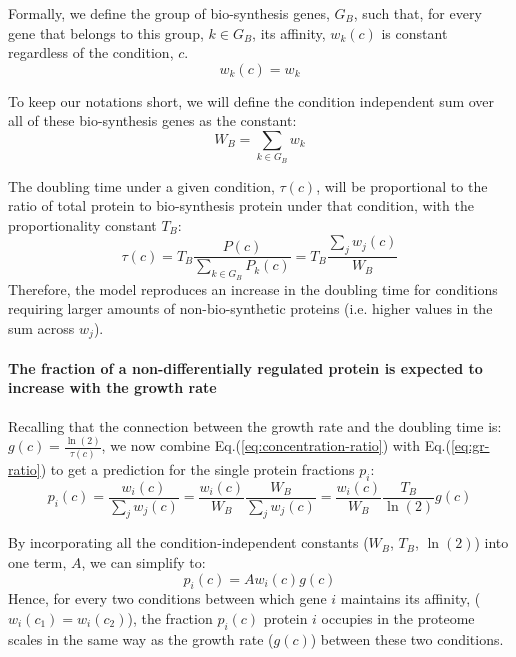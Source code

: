 \documentclass[10pt,letterpaper]{article}
\begin{document}
Formally, we define the group of bio-synthesis genes, $G_B$, such that, for every gene that belongs to this group, $k \in G_B$, its affinity, $w_k(c)$ is constant regardless of the condition, $c$.
\begin{equation}
  \label{eq:biosynth-def}
  w_k(c)=w_k
\end{equation}

To keep our notations short, we will define the condition independent sum over all of these bio-synthesis genes as the constant:
\[
W_B = \sum_{k\in G_B}w_k
\]

The doubling time under a given condition, $\tau(c)$, will be proportional to the ratio of total protein to bio-synthesis protein under that condition, with the proportionality constant $T_B$:
\begin{equation}
  \label{eq:gr-ratio}
  \tau(c) = T_B\frac{P(c)}{\sum_{k\in G_B}P_k(c)}=T_B\frac{\sum_jw_j(c)}{W_B}
\end{equation}
Therefore, the model reproduces an increase in the doubling time for conditions requiring larger amounts of non-bio-synthetic proteins (i.e. higher values in the sum across $w_j$).

\paragraph{The fraction of a non-differentially regulated protein is expected to increase with the growth rate}

Recalling that the connection between the growth rate and the doubling time is: $g(c)=\frac{\ln(2)}{\tau(c)}$, we now combine Eq.(\ref{eq:concentration-ratio}) with Eq.(\ref{eq:gr-ratio}) to get a prediction for the single protein fractions $p_i$:
\begin{equation}
  \label{eq:default-response}
  p_i(c)=\frac{w_i(c)}{\sum_jw_j(c)}=\frac{w_i(c)}{W_B}\frac{W_B}{\sum_jw_j(c)}=\frac{w_i(c)}{W_B}\frac{T_B}{\ln(2)}g(c)
\end{equation}

By incorporating all the condition-independent constants ($W_B$, $T_B$, $\ln(2)$) into one term, $A$, we can simplify to:
\begin{equation}
  \label{eq:final-conc}
  p_i(c)=Aw_i(c)g(c)
\end{equation}
Hence, for every two conditions between which gene $i$ maintains its affinity, ($w_i(c_1)=w_i(c_2)$), the fraction $p_i(c)$ protein $i$ occupies in the proteome scales in the same way as the growth rate ($g(c)$) between these two conditions.
\end{document}
